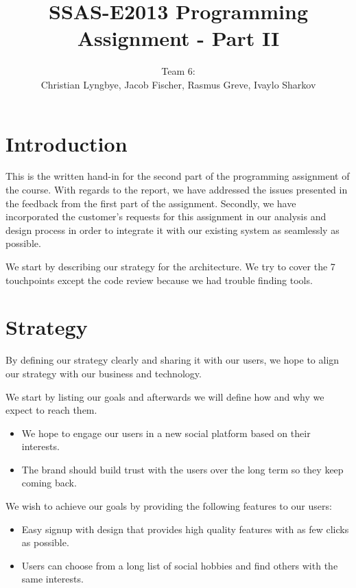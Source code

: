 \documentclass[a4paper]{article}
\title{SSAS-E2013 Programming Assignment - Part II}
\author{Team 6:\\Christian Lyngbye, Jacob Fischer, Rasmus Greve, Ivaylo Sharkov}
\begin{document}
\maketitle

\section{Introduction}
This is the written hand-in for the second part of the programming assignment of the course. With regards to the report, we have addressed the issues presented in the feedback from the first part of the assignment. Secondly, we have incorporated the customer's requests for this assignment in our analysis and design process in order to integrate it with our existing system as seamlessly as possible.

We start by describing our strategy for the architecture. We try to cover the 7 touchpoints except the code review because we had trouble finding tools. 

\section{Strategy}
By defining our strategy clearly and sharing it with our users, we hope to align our strategy with our business and technology.

We start by listing our goals and afterwards we will define how and why we expect to reach them.

\begin{itemize}
\item
We hope to engage our users in a new social platform based on their interests.
\item
The brand should build trust with the users over the long term so they keep coming back.
\end{itemize}

We wish to achieve our goals by providing the following features to our users:
\begin{itemize}
\item Easy signup with design that provides high quality features with as few clicks as possible.
\item Users can choose from a long list of social hobbies and find others with the same interests.
\end{itemize}
\end{document}
